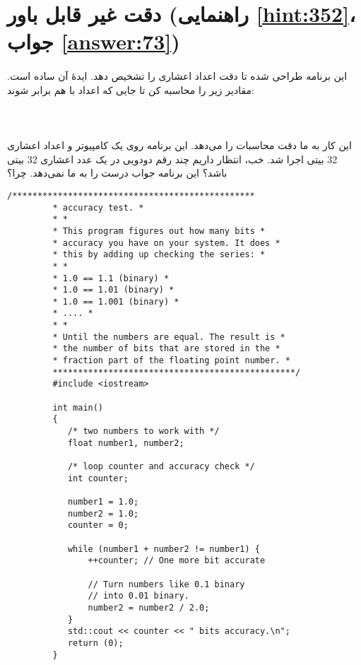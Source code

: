 \section[دقت غیر قابل باور]{دقت غیر قابل باور \protect{} (راهنمایی \ref{hint:352}، جواب \ref{answer:73})}
\paragraph{}\label{prog:40}
این برنامه طراحی شده تا دقت اعداد اعشاری را تشخیص دهد. ایدهٔ آن ساده است. مقادیر زیر را محاسبه کن تا جایی که اعداد با هم برابر شوند:
\LTR\noindent
{}\\
\\
\\
\\
\RTL
این کار به ما دقت محاسبات را می‌دهد. این برنامه روی یک کامپیوتر  و اعداد اعشاری 32 بیتی اجرا شد. خب، انتظار داریم چند رقم دودویی در یک عدد اعشاری 32 بیتی باشد؟ این برنامه جواب درست را به ما نمی‌دهد. چرا؟

\begin{LTR}
    \begin{lstlisting}[style=C++Style]
         /************************************************
         * accuracy test. *
         * *
         * This program figures out how many bits *
         * accuracy you have on your system. It does *
         * this by adding up checking the series: *
         * *
         * 1.0 == 1.1 (binary) *
         * 1.0 == 1.01 (binary) *
         * 1.0 == 1.001 (binary) *
         * .... *
         * *
         * Until the numbers are equal. The result is *
         * the number of bits that are stored in the *
         * fraction part of the floating point number. *
         ************************************************/
         #include <iostream>

         int main()
         {
         	/* two numbers to work with */
         	float number1, number2;

         	/* loop counter and accuracy check */
         	int counter;

         	number1 = 1.0;
         	number2 = 1.0;
         	counter = 0;

         	while (number1 + number2 != number1) {
         		++counter; // One more bit accurate

         		// Turn numbers like 0.1 binary
         		// into 0.01 binary.
         		number2 = number2 / 2.0;
         	}
         	std::cout << counter << " bits accuracy.\n";
         	return (0);
         }
    \end{lstlisting}
\end{LTR}